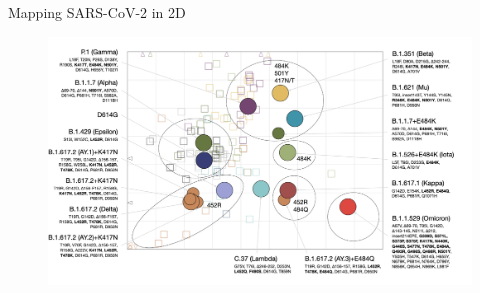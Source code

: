 \documentclass{beamer}
\begin{document}
\begin{frame}{Mapping SARS-CoV-2 in 2D}
    \begin{figure}
    \includegraphics[width=\textwidth]{sars_cov_2_map/wilks_3.png}
\end{figure}   
\centering
\vfill
\tiny{\cite{wilksMappingSARSCoV2Antigenic2022}}
\end{frame}

\end{document}
